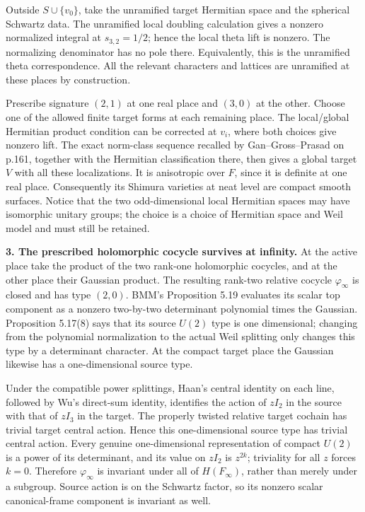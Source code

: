 Outside \(S\cup\{v_0\}\), take the unramified target Hermitian space and the spherical Schwartz data. The unramified local doubling calculation gives a nonzero normalized integral at \(s_{3,2}=1/2\); hence the local theta lift is nonzero. The normalizing denominator has no pole there. Equivalently, this is the unramified theta correspondence. All the relevant characters and lattices are unramified at these places by construction.

Prescribe signature \((2,1)\) at one real place and \((3,0)\) at the other. Choose one of the allowed finite target forms at each remaining place. The local/global Hermitian product condition can be corrected at \(v_i\), where both choices give nonzero lift. The exact norm-class sequence recalled by Gan--Gross--Prasad on p.161, together with the Hermitian classification there, then gives a global target \(V\) with all these localizations. It is anisotropic over \(F\), since it is definite at one real place. Consequently its Shimura varieties at neat level are compact smooth surfaces. Notice that the two odd-dimensional local Hermitian spaces may have isomorphic unitary groups; the choice is a choice of Hermitian space and Weil model and must still be retained.

\textbf{3. The prescribed holomorphic cocycle survives at infinity.} At the active place take the product of the two rank-one holomorphic cocycles, and at the other place their Gaussian product. The resulting rank-two relative cocycle \(\varphi_\infty\) is closed and has type \((2,0)\). BMM's Proposition 5.19 evaluates its scalar top component as a nonzero two-by-two determinant polynomial times the Gaussian. Proposition 5.17(8) says that its source \(U(2)\) type is one dimensional; changing from the polynomial normalization to the actual Weil splitting only changes this type by a determinant character. At the compact target place the Gaussian likewise has a one-dimensional source type.

Under the compatible power splittings, Haan's central identity on each line, followed by Wu's direct-sum identity, identifies the action of \(zI_2\) in the source with that of \(zI_3\) in the target. The properly twisted relative target cochain has trivial target central action. Hence this one-dimensional source type has trivial central action. Every genuine one-dimensional representation of compact \(U(2)\) is a power of its determinant, and its value on \(zI_2\) is \(z^{2k}\); triviality for all \(z\) forces \(k=0\). Therefore \(\varphi_\infty\) is invariant under all of \(H(F_\infty)\), rather than merely under a subgroup. Source action is on the Schwartz factor, so its nonzero scalar canonical-frame component is invariant as well.

